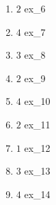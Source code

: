 \begin{enumerate}
\item 
\begin{ex}{6}{$2$}
	{ex_6}
\end{ex}

\item 
\begin{ex}{7}{$4$}
	{ex_7}
\end{ex}

\item 
\begin{ex}{8}{$3$}
	{ex_8}
\end{ex}

\item 
\begin{ex}{9}{$2$}
	{ex_9}
\end{ex}

\item 
\begin{ex}{10}{$4$}
	{ex_10}
\end{ex}
\item 
\begin{ex}{11}{$2$}
	{ex_11}
\end{ex}

\item 
\begin{ex}{12}{$1$}
	{ex_12}
\end{ex}

\item 
\begin{ex}{13}{$3$}
	{ex_13}
\end{ex}

\item 
\begin{ex}{14}{$4$}
	{ex_14}
\end{ex}

\end{enumerate}